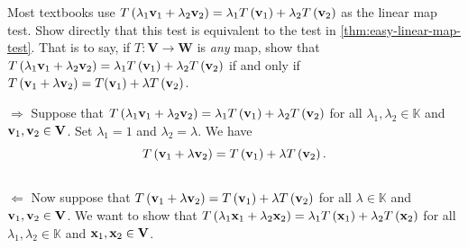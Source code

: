 \begin{exercise}
    Most textbooks use \( T \left( \lambda_{1} \vb{v}_{1} + \lambda_{2} \vb{v}_{2}\right) = \lambda_{1} T \left( \vb{v}_{1} \right) + \lambda_{2} T \left( \vb{v}_{2} \right)\) as the linear map test. Show directly that this test is equivalent to the test in \cref{thm:easy-linear-map-test}. That is to say, if \( T: \mathbf{V} \to \mathbf{W} \) is \emph{any} map, show that \(  T \left( \lambda_{1} \vb{v}_{1} + \lambda_{2} \vb{v}_{2}\right) = \lambda_{1} T \left( \vb{v}_{1} \right) + \lambda_{2} T \left( \vb{v}_{2} \right)\) if and only if \( T \left( \vb{v}_{1} + \lambda \vb{v}_{2} \right) = T(\vb{v}_{1}) + \lambda T \left( \vb{v}_{2} \right) \).
\end{exercise}
\begin{solution}
    \( \Rightarrow \) Suppose that \( T \left( \lambda_{1} \vb{v}_{1} + \lambda_{2} \vb{v}_{2}\right) = \lambda_{1} T \left( \vb{v}_{1} \right) + \lambda_{2} T \left( \vb{v}_{2} \right)\) for all \( \lambda_{1}, \lambda_{2} \in \mathbb{K} \) and \( \vb{v}_{1}, \vb{v}_{2} \in \mathbf{V} \). Set \( \lambda_{1} =1 \) and \( \lambda_{2} = \lambda \). We have
     \[ T \left( \vb{v}_{1} + \lambda \vb{v}_{2}\right) = T \left( \vb{v}_{1}  \right) + \lambda T \left(  \vb{v}_{2} \right).\]\\ 
    \( \Leftarrow \) Now suppose that \( T \left( \vb{v}_{1} + \lambda \vb{v}_{2}\right) = T \left( \vb{v}_{1}  \right) + \lambda T \left(  \vb{v}_{2} \right) \) for all \( \lambda \in \mathbb{K} \) and \( \vb{v}_{1}, \vb{v}_{2} \in \mathbf{V} \). We want to show that \( T \left( \lambda_{1} \vb{x}_{1} + \lambda_{2} \vb{x}_{2} \right) = \lambda_{1} T \left( \vb{x}_{1} \right) + \lambda_{2} T \left( \vb{x}_{2} \right) \) for all \( \lambda_{1}, \lambda_{2} \in \mathbb{K} \) and \( \vb{x}_{1}, \vb{x}_{2} \in \mathbf{V} \). \\
    

\end{solution}
